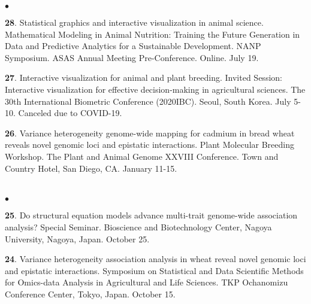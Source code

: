 \documentclass[margin,line,10pt]{res}
\newenvironment{list2}{
  \begin{list}{$\bullet$}{%
      \setlength{\itemsep}{0in}
      \setlength{\parsep}{0in} \setlength{\parskip}{0in}
      \setlength{\topsep}{0in} \setlength{\partopsep}{0in} 
      \setlength{\leftmargin}{0.2in}}}{\end{list}}
\begin{document}
\begin{resume}
\begin{list2}
     \vspace{0.5cm}

 \item [{\bf 28}.] Statistical graphics and interactive visualization in animal science. Mathematical Modeling in Animal Nutrition: Training the Future Generation in Data and Predictive Analytics for a Sustainable Development. NANP Symposium. ASAS Annual Meeting Pre-Conference. Online. July 19. 


  \vspace{0.5cm}


\item [{\bf 27}.] Interactive visualization for animal and plant breeding. Invited Session: Interactive visualization for effective decision-making in agricultural sciences. The 30th International Biometric Conference (2020IBC). Seoul, South Korea. July 5-10. Canceled due to COVID-19. 

  \vspace{0.5cm}
    
\item [{\bf 26}.] Variance heterogeneity genome-wide mapping for cadmium in bread wheat reveals novel genomic loci and epistatic interactions. Plant Molecular Breeding Workshop. The Plant and Animal Genome XXVIII Conference. Town and Country Hotel, San Diego, CA. January 11-15.
  
\end{list2}



\section{}
\begin{list2}

\item [{\bf 25}.] Do structural equation models advance multi-trait genome-wide association analysis? Special Seminar. Bioscience and Biotechnology Center, Nagoya University, Nagoya, Japan. October 25. 
  
  \vspace{0.5cm}
  
   \item [{\bf 24}.] Variance heterogeneity association analysis in wheat reveal novel genomic loci and epistatic interactions. Symposium on Statistical and Data Scientific Methods for Omics-data Analysis in Agricultural and Life Sciences. TKP Ochanomizu Conference Center, Tokyo, Japan. October 15.

     \vspace{0.5cm}
    

\end{list2}
\end{resume}
\end{document}
